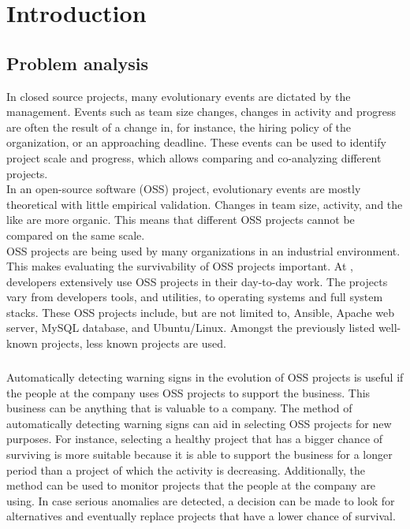 \chapter{Introduction}
\label{introduction}

\section{Problem analysis}

In closed source projects, many evolutionary events are dictated by the
management. Events such as team size changes, changes in activity and progress
are often the result of a change in, for instance, the hiring policy of the
organization, or an approaching deadline. These events can be used to identify
project scale and progress, which allows comparing and co-analyzing different
projects.\\

In an open-source software (OSS) project, evolutionary events are mostly
theoretical with little empirical validation. Changes in team size, activity,
and the like are more organic. This means that different OSS projects cannot be
compared on the same scale.\\

OSS projects are being used by many organizations in an industrial environment.
This makes evaluating the survivability of OSS projects important.
At \hostOrg, developers extensively use OSS projects in their day-to-day
work. The projects vary from developers tools, and utilities, to operating
systems and full system stacks. These OSS projects include, but are not limited
to, Ansible, Apache web server, MySQL database, and Ubuntu/Linux. Amongst the
previously listed well-known projects, less known projects are used.

\paragraph{}
Automatically detecting warning signs in the evolution of OSS projects is useful
if the people at the company uses OSS projects to support the business. This
business can be anything that is valuable to a company. The method of
automatically detecting warning signs can aid in selecting OSS projects for new
purposes. For instance, selecting a healthy project that has a bigger chance of
surviving is more suitable because it is able to support the business for a
longer period than a project of which the activity is decreasing. Additionally,
the method can be used to monitor projects that the people at the company are
using. In case serious anomalies are detected, a decision can be made to look
for alternatives and eventually replace projects that have a lower chance of
survival.

